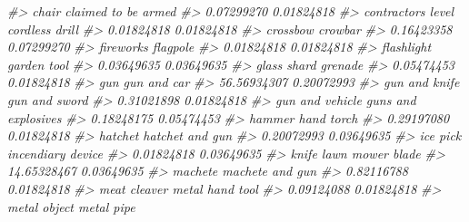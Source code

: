 \documentclass[
  12pt,
]{book}
\newenvironment{Shaded}{\begin{snugshade}}{\end{snugshade}}
\newcommand{\CommentTok}[1]{\textcolor[rgb]{0.37,0.37,0.37}{\textit{#1}}}
\begin{document}
\begin{Shaded}
\begin{Highlighting}[]
\CommentTok{\#>                            chair              claimed to be armed }
\CommentTok{\#>                       0.07299270                       0.01824818 }
\CommentTok{\#>               contractor\textquotesingle{}s level                   cordless drill }
\CommentTok{\#>                       0.01824818                       0.01824818 }
\CommentTok{\#>                         crossbow                          crowbar }
\CommentTok{\#>                       0.16423358                       0.07299270 }
\CommentTok{\#>                        fireworks                         flagpole }
\CommentTok{\#>                       0.01824818                       0.01824818 }
\CommentTok{\#>                       flashlight                      garden tool }
\CommentTok{\#>                       0.03649635                       0.03649635 }
\CommentTok{\#>                      glass shard                          grenade }
\CommentTok{\#>                       0.05474453                       0.01824818 }
\CommentTok{\#>                              gun                      gun and car }
\CommentTok{\#>                      56.56934307                       0.20072993 }
\CommentTok{\#>                    gun and knife                    gun and sword }
\CommentTok{\#>                       0.31021898                       0.01824818 }
\CommentTok{\#>                  gun and vehicle              guns and explosives }
\CommentTok{\#>                       0.18248175                       0.05474453 }
\CommentTok{\#>                           hammer                       hand torch }
\CommentTok{\#>                       0.29197080                       0.01824818 }
\CommentTok{\#>                          hatchet                  hatchet and gun }
\CommentTok{\#>                       0.20072993                       0.03649635 }
\CommentTok{\#>                         ice pick                incendiary device }
\CommentTok{\#>                       0.01824818                       0.03649635 }
\CommentTok{\#>                            knife                 lawn mower blade }
\CommentTok{\#>                      14.65328467                       0.03649635 }
\CommentTok{\#>                          machete                  machete and gun }
\CommentTok{\#>                       0.82116788                       0.01824818 }
\CommentTok{\#>                     meat cleaver                  metal hand tool }
\CommentTok{\#>                       0.09124088                       0.01824818 }
\CommentTok{\#>                     metal object                       metal pipe }

\end{Highlighting}
\end{Shaded}
\end{document}
